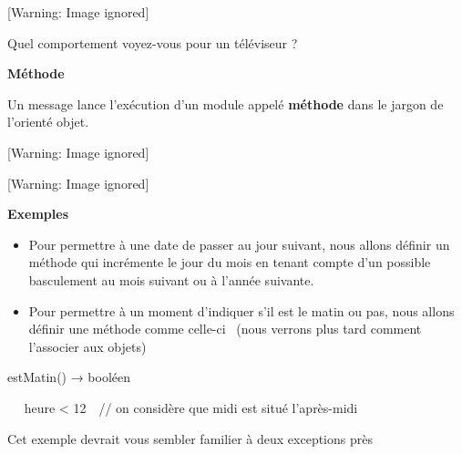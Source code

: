 \begin{center}
 [Warning: Image ignored] %

\end{center}
{
Quel comportement voyez-vous pour un téléviseur ?}


\bigskip

{\sffamily\bfseries\upshape
Méthode}

{
Un message lance l'exécution d'un
module appelé \textbf{méthode} dans le jargon de
l'orienté objet. }

\begin{center}
 [Warning: Image ignored] %

\end{center}
\begin{center}
 [Warning: Image ignored] %

\end{center}
{\bfseries
Exemples}

\liststyleListv
\begin{itemize}
\item {
Pour permettre à une date de passer au jour suivant, nous allons définir
un méthode qui incrémente le jour du mois en tenant compte
d'un possible basculement au mois suivant ou à
l'année suivante.}
\item {
Pour permettre à un moment d'indiquer
s'il est le matin ou pas, nous allons définir une
méthode comme celle-ci \ (nous verrons plus tard comment
l'associer aux objets)}
\end{itemize}
{\sffamily
{}}

{\sffamily
{}}

{\sffamily
{} estMatin() → booléen}

{\sffamily
\ \  heure {\textless} 12\ \ // on considère
que midi est situé l'après-midi}

{\sffamily
{} }

{
Cet exemple devrait vous sembler familier à deux exceptions près}

